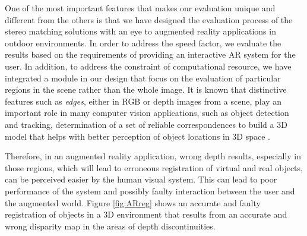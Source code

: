 One of the most important features that makes our evaluation unique and different from the others is that we have 
designed the evaluation process of the stereo matching solutions with an eye to augmented 
reality applications in outdoor environments.
In order to address the speed factor, we evaluate the results based on the requirements of providing an interactive AR system for the user.
In addition, to address the constraint of computational resource, we have integrated a module in our design that 
focus on the evaluation of particular regions in the scene rather than 
the whole image. 
It is known that distinctive features such as {\it edges}, either in RGB or depth images from a scene, 
play an important role in many computer vision applications, such as object detection and 
tracking, determination of a set of reliable correspondences to build a 
3D model that helps with better perception of object locations in 3D space \cite{mart01,sze11}.

Therefore, in an augmented reality application, wrong depth results, especially in those regions, 
which will lead to erroneous registration of virtual and real objects, 
can be perceived easier by the human visual system. This can lead to poor performance of the system and possibly faulty interaction between 
the user and the augmented world.
Figure \ref{fig:ARreg} shows an accurate and faulty registration of objects in a 3D environment that results from an accurate and 
wrong disparity map in the areas of depth discontinuities.

